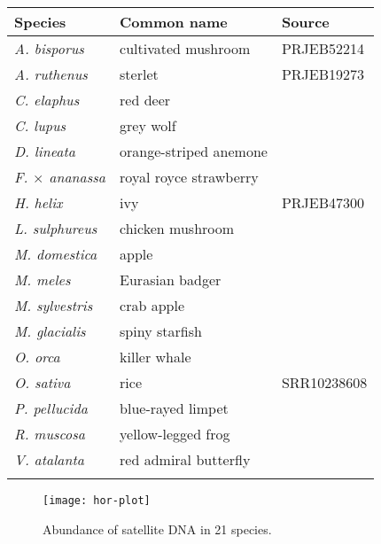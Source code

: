 \documentclass{bioinfo}
\begin{document}
\begin{table}[bt]
{\label{tab:dtol}
\begin{tabular}{lll}
\toprule
Species & Common name & Source \\
\midrule
\emph{A. bisporus} & cultivated mushroom & PRJEB52214 \\
\emph{A. ruthenus} & sterlet & PRJEB19273 \\
\emph{C. elaphus} & red deer & \citet{pemberton_genome_2021} \\
\emph{C. lupus} & grey wolf & \citet{sinding_genome_2021}\\
\emph{D. lineata} & orange-striped anemone & \citet{wood_genome_2022} \\
\emph{F. $\times$ ananassa} & royal royce strawberry & \citet{Hon:2020aa} \\
\emph{H. helix} & ivy & PRJEB47300 \\
\emph{L. sulphureus} & chicken mushroom & \citet{wright_genome_2022} \\
\emph{M. domestica} & apple & \citet{konyves_genome_2022} \\
\emph{M. meles} & Eurasian badger & \citet{newman_genome_2022} \\
\emph{M. sylvestris} & crab apple & \citet{ruhsam_genome_2022} \\
\emph{M. glacialis} & spiny starfish & \citet{lawniczak_genome_2021} \\
\emph{O. orca} & killer whale & \citet{foote_genome_2022} \\
\emph{O. sativa} & rice & SRR10238608 \\
\emph{P. pellucida} & blue-rayed limpet & \citet{lawniczak_genome_2022} \\
\emph{R. muscosa} & yellow-legged frog & \citet{Hon:2020aa} \\
\emph{V. atalanta} & red admiral butterfly & \citet{lohse_genome_2021} \\
\botrule
\end{tabular}}{}
\end{table}

\begin{figure}\label{fig:dtol}
\texttt{[image: hor-plot]}
\caption{Abundance of satellite DNA in 21 species.}
\end{figure}
\end{document}
